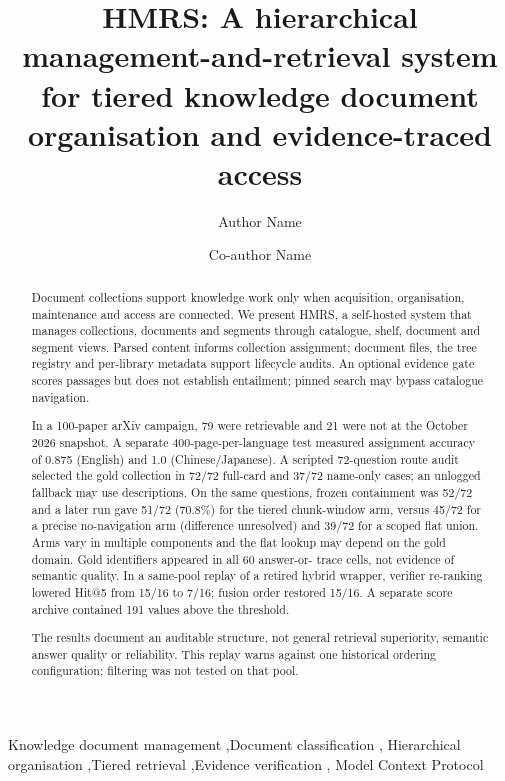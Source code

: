 \documentclass[final,5p,times,twocolumn]{elsarticle}
\begin{document}
\raggedbottom

\begin{frontmatter}

\title{HMRS: A hierarchical management-and-retrieval system for tiered
knowledge document organisation and evidence-traced access}

\author[inst1]{Author Name}
\author[inst1]{Co-author Name}

\begin{abstract}
Document collections support knowledge work only when acquisition,
organisation, maintenance and access are connected. We present HMRS, a
self-hosted system that manages collections, documents and segments through
catalogue, shelf, document and segment views. Parsed content informs collection
assignment; document files, the tree registry and per-library metadata support
lifecycle audits. An optional evidence gate scores passages but does not
establish entailment; pinned search may bypass catalogue navigation.

In a 100-paper arXiv campaign, 79 were retrievable and 21 were not at the October 2026 snapshot. A separate
400-page-per-language test measured assignment accuracy of 0.875 (English) and
1.0 (Chinese/Japanese). A scripted 72-question route audit selected the gold
collection in 72/72 full-card and 37/72 name-only cases; an unlogged fallback
may use descriptions. On the same questions, frozen containment was 52/72 and
a later run gave 51/72 (70.8\%) for the tiered chunk-window arm,
versus 45/72 for a precise no-navigation arm (difference unresolved) and 39/72
for a scoped flat union. Arms vary in multiple components and the flat lookup
may depend on the gold domain. Gold identifiers appeared in all 60 answer-or-
trace cells, not evidence of semantic quality. In a same-pool replay of a
retired hybrid wrapper, verifier re-ranking lowered Hit@5 from 15/16 to 7/16;
fusion order restored 15/16. A separate score archive contained 191 values
above the threshold.

The results document an auditable structure, not general retrieval superiority,
semantic answer quality or reliability. This replay warns against one
historical ordering configuration; filtering was not tested on that pool.


\end{abstract}

\begin{keyword}
Knowledge document management \sep Document classification \sep
Hierarchical organisation \sep Tiered retrieval \sep Evidence verification \sep
Model Context Protocol
\end{keyword}

\end{frontmatter}
\end{document}
